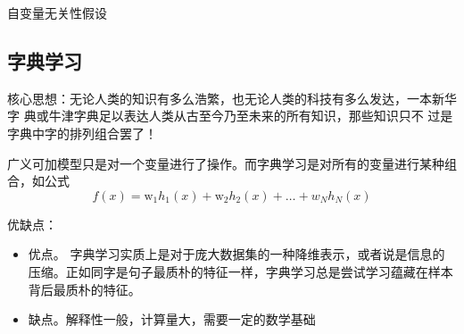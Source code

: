 \documentclass[10pt, a4paper]{article}
\begin{document}
自变量无关性假设

\subsection{字典学习}

核心思想：无论人类的知识有多么浩繁，也无论人类的科技有多么发达，一本新华字
典或牛津字典足以表达人类从古至今乃至未来的所有知识，那些知识只不
过是字典中字的排列组合罢了！

广义可加模型只是对一个变量进行了操作。而字典学习是对所有的变量进行某种组合，如公式
$$
f(x)=\mathrm{w}_{1} h_{1}(x)+\mathrm{w}_{2} h_{2}(x)+\ldots+w_{N} h_{N}(x)
$$

优缺点：
\begin{itemize}
	\item 优点。 字典学习实质上是对于庞大数据集的一种降维表示，或者说是信息的压缩。正如同字是句子最质朴的特征一样，字典学习总是尝试学习蕴藏在样本背后最质朴的特征。
	\item 缺点。解释性一般，计算量大，需要一定的数学基础
\end{itemize}
\end{document}
